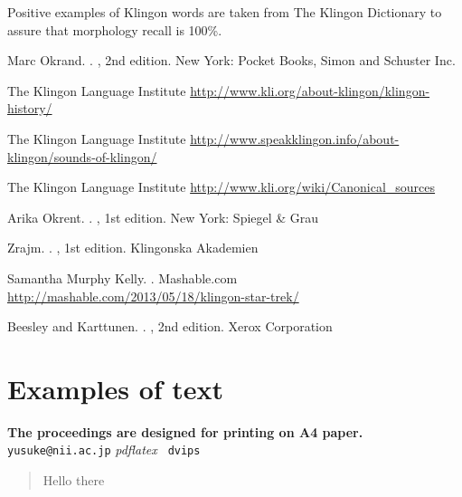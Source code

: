 \documentclass[11pt]{article}
\begin{document}
Positive examples of Klingon words are taken from The Klingon Dictionary to assure that morphology recall is 100\%.

%
%

\begin{thebibliography}{}

Marc Okrand.
.
, 2nd edition.
\newblock New York: Pocket Books, Simon and Schuster Inc.

\newblock The Klingon Language Institute
\newblock \url{http://www.kli.org/about-klingon/klingon-history/}

\newblock The Klingon Language Institute
\newblock \url{http://www.speakklingon.info/about-klingon/sounds-of-klingon/}

\newblock The Klingon Language Institute
\newblock \url{http://www.kli.org/wiki/Canonical_sources}

Arika Okrent.
.
, 1st edition.
\newblock New York: Spiegel \& Grau

Zrajm.
.
, 1st edition.
\newblock Klingonska Akademien

Samantha Murphy Kelly.
.
\newblock Mashable.com
\newblock \url{http://mashable.com/2013/05/18/klingon-star-trek/}

Beesley and Karttunen.
.
, 2nd edition.
\newblock Xerox Corporation

\end{thebibliography}

\section{Examples of text}

\textbf{The proceedings are designed for printing on A4
  paper.}
\texttt{yusuke@nii.ac.jp}
\textit{pdflatex}
\texttt{ dvips}

\begin{quote}
Hello there
\end{quote}
\end{document}
